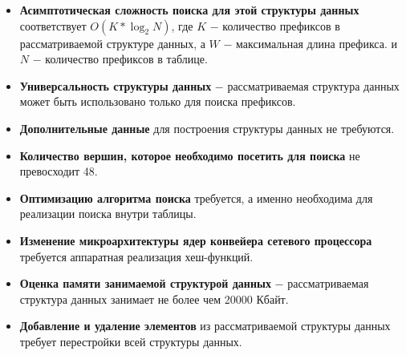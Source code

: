 \documentclass[a4peper, 12pt, titlepage, finall]{report}
\begin{document}
            \begin{itemize}
                \item\textbf{Асимптотическая сложность поиска для этой структуры данных} соответствует {\ttfamily $O(K*\log_2{N})$},
                где {\ttfamily $K$} $-$ количество префиксов в рассматриваемой структуре данных, а {\ttfamily $W$} $-$ максимальная длина префикса.
                и {\ttfamily $N$} $-$ количество префиксов в таблице.
                \item\textbf{Универсальность структуры данных} $-$ рассматриваемая структура данных может быть использовано только для поиска префиксов.
                \item\textbf{Дополнительные данные} для построения структуры данных не требуются.
                \item\textbf{Количество вершин, которое необходимо посетить для поиска} не превосходит 48.
                \item\textbf{Оптимизацию алгоритма поиска} требуется, а именно необходима для реализации поиска внутри таблицы.
                \item\textbf{Изменение микроархитектуры ядер конвейера сетевого процессора} требуется аппаратная реализация хеш-функций.
                \item\textbf{Оценка памяти занимаемой структурой данных} $-$ рассматриваемая структура данных занимает не более чем 20000 Кбайт.
                \item\textbf{Добавление и удаление элементов} из рассматриваемой структуры данных требует перестройки всей структуры данных.
            \end{itemize}
\end{document}
